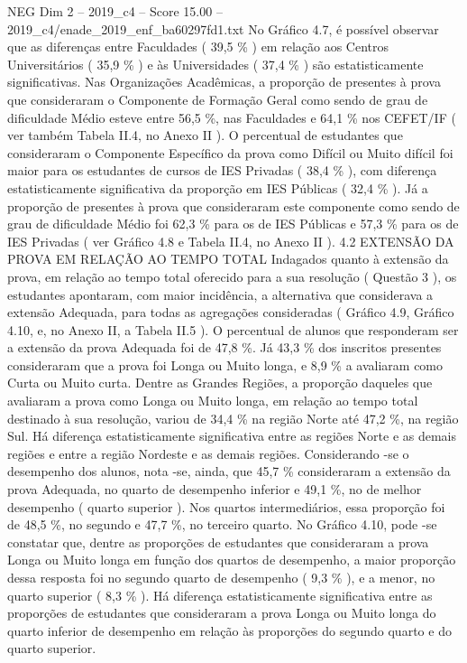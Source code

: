\begin{textsample}{NEG Dim 2 – 2019\_c4 – Score 15.00 – 2019\_c4/enade\_2019\_enf\_ba60297fd1.txt}
No Gráfico 4.7, é possível observar que as diferenças entre Faculdades ( 39,5 \% ) em relação aos Centros Universitários ( 35,9 \% ) e às Universidades ( 37,4 \% ) são estatisticamente significativas.
Nas Organizações Acadêmicas, a proporção de presentes à prova que consideraram o Componente de Formação Geral como sendo de grau de dificuldade Médio esteve entre 56,5 \%, nas Faculdades e 64,1 \% nos CEFET/IF ( ver também Tabela II.4, no Anexo II ).
O percentual de estudantes que consideraram o Componente Específico da prova como Difícil ou Muito difícil foi maior para os estudantes de cursos de IES Privadas ( 38,4 \% ), com diferença estatisticamente significativa da proporção em IES Públicas ( 32,4 \% ).
Já a proporção de presentes à prova que consideraram este componente como sendo de grau de dificuldade Médio foi 62,3 \% para os de IES Públicas e 57,3 \% para os de IES Privadas ( ver Gráfico 4.8 e Tabela II.4, no Anexo II ). 4.2 EXTENSÃO DA PROVA EM RELAÇÃO AO TEMPO TOTAL Indagados quanto à extensão da prova, em relação ao tempo total oferecido para a sua resolução ( Questão 3 ), os estudantes apontaram, com maior incidência, a alternativa que considerava a extensão Adequada, para todas as agregações consideradas ( Gráfico 4.9, Gráfico 4.10, e, no Anexo II, a Tabela II.5 ).
O percentual de alunos que responderam ser a extensão da prova Adequada foi de 47,8 \%.
Já 43,3 \% dos inscritos presentes consideraram que a prova foi Longa ou Muito longa, e 8,9 \% a avaliaram como Curta ou Muito curta.
Dentre as Grandes Regiões, a proporção daqueles que avaliaram a prova como Longa ou Muito longa, em relação ao tempo total destinado à sua resolução, variou de 34,4 \% na região Norte até 47,2 \%, na região Sul.
Há diferença estatisticamente significativa entre as regiões Norte e as demais regiões e entre a região Nordeste e as demais regiões.
Considerando -se o desempenho dos alunos, nota -se, ainda, que 45,7 \% consideraram a extensão da prova Adequada, no quarto de desempenho inferior e 49,1 \%, no de melhor desempenho ( quarto superior ).
Nos quartos intermediários, essa proporção foi de 48,5 \%, no segundo e 47,7 \%, no terceiro quarto.
No Gráfico 4.10, pode -se constatar que, dentre as proporções de estudantes que consideraram a prova Longa ou Muito longa em função dos quartos de desempenho, a maior proporção dessa resposta foi no segundo quarto de desempenho ( 9,3 \% ), e a menor, no quarto superior ( 8,3 \% ).
Há diferença estatisticamente significativa entre as proporções de estudantes que consideraram a prova Longa ou Muito longa do quarto inferior de desempenho em relação às proporções do segundo quarto e do quarto superior.

\end{textsample}
